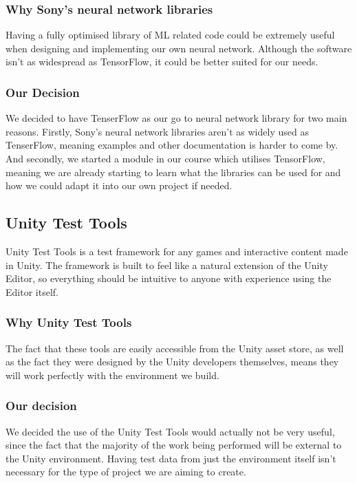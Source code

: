 \subsubsection{Why Sony’s neural network libraries}
Having a fully optimised library of ML related code could be extremely useful when designing and implementing our own neural network. Although the software isn’t as widespread as TensorFlow, it could be better suited for our needs.

\subsubsection{Our Decision}
We decided to have TenserFlow as our go to neural network library for two main reasons. Firstly, Sony’s neural network libraries aren’t as widely used as TenserFlow, meaning examples and other documentation is harder to come by. And secondly, we started a module in our course which utilises TensorFlow, meaning we are already starting to learn what the libraries can be used for and how we could adapt it into our own project if needed.

\subsection{Unity Test Tools} 
Unity Test Tools is a test framework for any games and interactive content made in Unity. The framework is built to feel like a natural extension of the Unity Editor, so everything should be intuitive to anyone with experience using the Editor itself.

\subsubsection{Why Unity Test Tools}
The fact that these tools are easily accessible from the Unity asset store, as well as the fact they were designed by the Unity developers themselves, means they will work perfectly with the environment we build.

\subsubsection{Our decision}
We decided the use of the Unity Test Tools would actually not be very useful, since the fact that the majority of the work being performed will be external to the Unity environment. Having test data from just the environment itself isn’t necessary for the type of project we are aiming to create.

